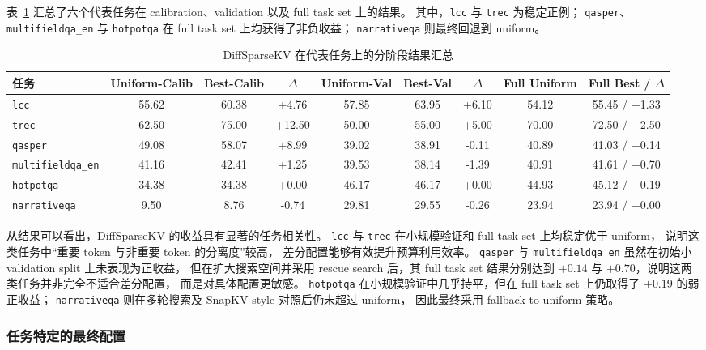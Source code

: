 表~\ref{tab:diffsparsekv-task-stages} 汇总了六个代表任务在
calibration、validation 以及 full task set 上的结果。
其中，\texttt{lcc} 与 \texttt{trec} 为稳定正例；
\texttt{qasper}、\texttt{multifieldqa\_en} 与 \texttt{hotpotqa}
在 full task set 上均获得了非负收益；
\texttt{narrativeqa} 则最终回退到 uniform。

\begin{table}[t]
\centering
\caption{DiffSparseKV 在代表任务上的分阶段结果汇总}
\label{tab:diffsparsekv-task-stages}
\small
\setlength{\tabcolsep}{4pt}
\begin{tabular}{lcccccccc}
\toprule
任务 & Uniform-Calib & Best-Calib & $\Delta$ & Uniform-Val & Best-Val & $\Delta$ & Full Uniform & Full Best / $\Delta$ \\
\midrule
\texttt{lcc} & 55.62 & 60.38 & +4.76 & 57.85 & 63.95 & +6.10 & 54.12 & 55.45 / +1.33 \\
\texttt{trec} & 62.50 & 75.00 & +12.50 & 50.00 & 55.00 & +5.00 & 70.00 & 72.50 / +2.50 \\
\texttt{qasper} & 49.08 & 58.07 & +8.99 & 39.02 & 38.91 & -0.11 & 40.89 & 41.03 / +0.14 \\
\texttt{multifieldqa\_en} & 41.16 & 42.41 & +1.25 & 39.53 & 38.14 & -1.39 & 40.91 & 41.61 / +0.70 \\
\texttt{hotpotqa} & 34.38 & 34.38 & +0.00 & 46.17 & 46.17 & +0.00 & 44.93 & 45.12 / +0.19 \\
\texttt{narrativeqa} & 9.50 & 8.76 & -0.74 & 29.81 & 29.55 & -0.26 & 23.94 & 23.94 / +0.00 \\
\bottomrule
\end{tabular}
\end{table}

从结果可以看出，DiffSparseKV 的收益具有显著的任务相关性。
\texttt{lcc} 与 \texttt{trec} 在小规模验证和 full task set 上均稳定优于 uniform，
说明这类任务中“重要 token 与非重要 token 的分离度”较高，
差分配置能够有效提升预算利用效率。
\texttt{qasper} 与 \texttt{multifieldqa\_en} 虽然在初始小 validation split 上未表现为正收益，
但在扩大搜索空间并采用 rescue search 后，其 full task set 结果分别达到
$+0.14$ 与 $+0.70$，说明这两类任务并非完全不适合差分配置，
而是对具体配置更敏感。
\texttt{hotpotqa} 在小规模验证中几乎持平，但在 full task set 上仍取得了
$+0.19$ 的弱正收益；
\texttt{narrativeqa} 则在多轮搜索及 SnapKV-style 对照后仍未超过 uniform，
因此最终采用 fallback-to-uniform 策略。

\subsubsection{任务特定的最终配置}

